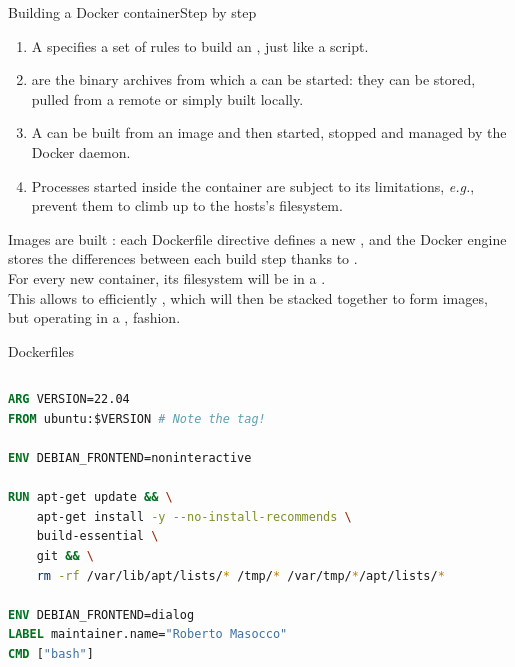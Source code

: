 \begin{frame}{Building a Docker container}{Step by step}
	\begin{enumerate}
		\item A  specifies a set of rules to build an , just like a script.
		\item {} are the binary archives from which a  can be started: they can be stored, pulled from a remote  or simply built locally.
		\item A  can be built from an image and then started, stopped and managed by the Docker daemon.
		\item Processes started inside the container are subject to its limitations, \emph{e.g.},  prevent them to climb up to the hosts's filesystem.
	\end{enumerate}
	Images are built : each Dockerfile directive defines a new , and the Docker engine stores the differences between each build step thanks to .\\
	For every new container, its filesystem will be in a .\\
	This allows to efficiently , which will then be stacked together to form images, but operating in a ,  fashion.
\end{frame}

\begin{frame}[fragile]{Dockerfiles}
	\begin{columns}
		\begin{lstlisting}[language=Dockerfile, caption=Minimal example of a Dockerfile running an Ubuntu image in a container.]
ARG VERSION=22.04
FROM ubuntu:$VERSION # Note the tag!

ENV DEBIAN_FRONTEND=noninteractive

RUN apt-get update && \
    apt-get install -y --no-install-recommends \
    build-essential \
    git && \
    rm -rf /var/lib/apt/lists/* /tmp/* /var/tmp/*/apt/lists/*

ENV DEBIAN_FRONTEND=dialog
LABEL maintainer.name="Roberto Masocco"
CMD ["bash"]
\end{lstlisting}
	\end{columns}
\end{frame}

